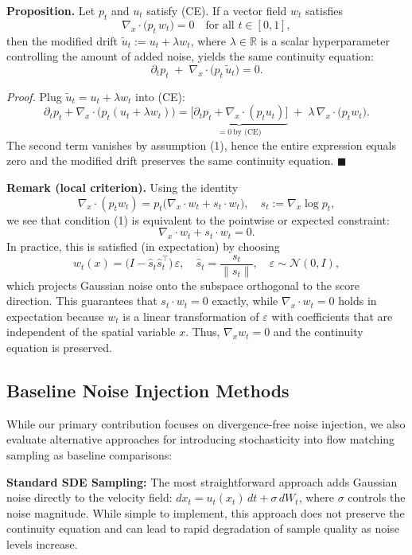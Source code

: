 \documentclass{article}
\begin{document}
\bigskip
\noindent\textbf{Proposition.}  
Let \(p_t\) and \(u_t\) satisfy \textup{(CE)}.  
If a vector field \(w_t\) satisfies
\[
\nabla_x\!\cdot\!\bigl(p_t\,w_t\bigr)=0
\quad\text{for all }t\in[0,1],
\tag{1}
\]
then the modified drift
\(
\tilde u_t := u_t + \lambda w_t
\),
where \(\lambda \in \mathbb{R}\) is a scalar hyperparameter controlling the amount of added noise,
yields the same continuity equation:
\[
\partial_t p_t\;+\;\nabla_x\!\cdot\!\bigl(p_t\,\tilde u_t\bigr)=0.
\]

\smallskip
\noindent\emph{Proof.}  
Plug \(\tilde u_t = u_t + \lambda w_t\) into \textup{(CE)}:
\[
\partial_t p_t + \nabla_x\!\cdot\!\bigl(p_t(u_t+\lambda w_t)\bigr)
   = \underbrace{\bigl[\partial_t p_t + \nabla_x\!\cdot(p_t u_t)\bigr]}_{=0\ \text{by (CE)}}
     \;+\;\lambda\,\nabla_x\!\cdot\!\bigl(p_t w_t\bigr).
\]
The second term vanishes by assumption \textup{(1)}, hence the entire expression equals zero and the modified drift preserves the same continuity equation.
\hfill$\blacksquare$

\bigskip
\noindent\textbf{Remark (local criterion).}
Using the identity
\[
\nabla_x\!\cdot(p_t w_t)=p_t\bigl(\nabla_x\!\cdot w_t + s_t\!\cdot w_t\bigr),
\quad s_t := \nabla_x\!\log p_t,
\]
we see that condition \textup{(1)} is equivalent to the pointwise or expected constraint:
\[
\boxed{\nabla_x\!\cdot w_t + s_t\!\cdot w_t = 0.}
\]
In practice, this is satisfied (in expectation) by choosing
\[
w_t(x) = \bigl(I - \hat s_t \hat s_t^\top\bigr)\,\varepsilon,
\quad \hat s_t = \frac{s_t}{\|s_t\|},
\quad \varepsilon \sim \mathcal{N}(0,I),
\]
which projects Gaussian noise onto the subspace orthogonal to the score direction. This guarantees that \(s_t \cdot w_t = 0\) exactly, while \(\nabla_x \cdot w_t = 0\) holds in expectation because \(w_t\) is a linear transformation of \(\varepsilon\) with coefficients that are independent of the spatial variable \(x\). Thus, \(\nabla_x w_t = 0\) and the continuity equation is preserved.

\subsection{Baseline Noise Injection Methods}

While our primary contribution focuses on divergence-free noise injection, we also evaluate alternative approaches for introducing stochasticity into flow matching sampling as baseline comparisons:

\textbf{Standard SDE Sampling:} The most straightforward approach adds Gaussian noise directly to the velocity field: $dx_t = u_t(x_t)\,dt + \sigma\,dW_t$, where $\sigma$ controls the noise magnitude. While simple to implement, this approach does not preserve the continuity equation and can lead to rapid degradation of sample quality as noise levels increase.
\end{document}
